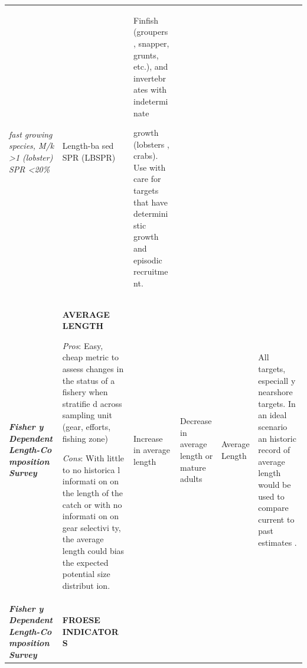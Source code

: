 \documentclass[]{book}
\begin{document}
\begin{longtable}[]{@{}llllll@{}}
\begin{minipage}[t]{0.16\columnwidth}
\emph{fast growing species, M/k \textgreater{}1 (lobster) SPR
\textless{}20\%}\strut
\end{minipage} & \begin{minipage}[t]{0.16\columnwidth}\raggedright\strut
Length-ba sed SPR (LBSPR)\strut
\end{minipage} & \begin{minipage}[t]{0.16\columnwidth}\raggedright\strut
Finfish (groupers , snapper, grunts, etc.), and invertebr ates with
indetermi nate

growth (lobsters , crabs). Use with care for targets that have determini
stic growth and episodic recruitme nt.\strut
\end{minipage}\tabularnewline
\begin{minipage}[t]{0.16\columnwidth}\raggedright\strut
\textbf{\emph{Fisher y Dependent Length-Co mposition Survey}}\strut
\end{minipage} & \begin{minipage}[t]{0.16\columnwidth}\raggedright\strut
\textbf{AVERAGE LENGTH}

\emph{Pros}: Easy, cheap metric to assess changes in the status of a
fishery when stratifie d across sampling unit (gear, efforts, fishing
zone)

\emph{Cons}: With little to no historica l informati on on the length of
the catch or with no informati on on gear selectivi ty, the average
length could bias the expected potential size distribut ion.\strut
\end{minipage} & \begin{minipage}[t]{0.16\columnwidth}\raggedright\strut
Increase in average length\strut
\end{minipage} & \begin{minipage}[t]{0.16\columnwidth}\raggedright\strut
Decrease in average length or mature adults\strut
\end{minipage} & \begin{minipage}[t]{0.16\columnwidth}\raggedright\strut
Average Length\strut
\end{minipage} & \begin{minipage}[t]{0.16\columnwidth}\raggedright\strut
All targets, especiall y nearshore targets. In an ideal scenario an
historic record of average length would be used to compare current to
past estimates .\strut
\end{minipage}\tabularnewline
\begin{minipage}[t]{0.16\columnwidth}\raggedright\strut
\textbf{\emph{Fisher y Dependent Length-Co mposition Survey}}\strut
\end{minipage} & \begin{minipage}[t]{0.16\columnwidth}\raggedright\strut
\textbf{FROESE INDICATOR S}


\end{minipage}
\end{longtable}
\end{document}
